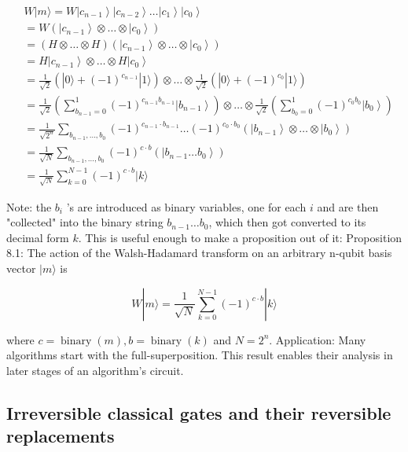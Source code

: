 \documentclass[main.tex]{subfiles}
\begin{document}
    $$
    \begin{aligned}
    &W|m\rangle=W\left|c_{n-1}\right\rangle\left|c_{n-2}\right\rangle \ldots\left|c_{1}\right\rangle\left|c_{0}\right\rangle\\
    &=W\left(\left|c_{n-1}\right\rangle \otimes \ldots \otimes\left|c_{0}\right\rangle\right)\\
    &=(H \otimes \ldots \otimes H)\left(\left|c_{n-1}\right\rangle \otimes \ldots \otimes\left|c_{0}\right\rangle\right)\\
    &=H\left|c_{n-1}\right\rangle \otimes \ldots \otimes H\left|c_{0}\right\rangle\\
    &=\frac{1}{\sqrt{2}}\left(|0\rangle+(-1)^{c_{n-1}}|1\rangle\right) \otimes \ldots \otimes \frac{1}{\sqrt{2}}\left(|0\rangle+(-1)^{c_{0}}|1\rangle\right)\\
    &=\frac{1}{\sqrt{2}}\left(\sum_{b_{n-1}=0}^{1}(-1)^{c_{n-1} b_{n-1}}\left|b_{n-1}\right\rangle\right) \otimes \ldots \otimes \frac{1}{\sqrt{2}}\left(\sum_{b_{0}=0}^{1}(-1)^{c_{0} b_{0}}\left|b_{0}\right\rangle\right)\\
    &=\frac{1}{\sqrt{2^{n}}} \sum_{b_{n-1}, \ldots, b_{0}}(-1)^{c_{n-1} \cdot b_{n-1}} \ldots(-1)^{c_{0} \cdot b_{0}}\left(\left|b_{n-1}\right\rangle \otimes \ldots \otimes\left|b_{0}\right\rangle\right)\\
    &=\frac{1}{\sqrt{N}} \sum_{b_{n-1}, \ldots, b_{0}}(-1)^{c \cdot b}\left(\left|b_{n-1} \ldots b_{0}\right\rangle\right)\\
    &=\frac{1}{\sqrt{N}} \sum_{k=0}^{N-1}(-1)^{c \cdot b}|k\rangle
    \end{aligned}
    $$
    
    Note: the $b_{i}$ 's are introduced as binary variables, one for each $i$ and are then "collected" into the binary string $b_{n-1} \ldots b_{0}$, which then got converted to its decimal form $k$. This is useful enough to make a proposition out of it: Proposition 8.1: The action of the Walsh-Hadamard transform on an arbitrary n-qubit basis vector $|m\rangle$ is
   
    $$
    W|m\rangle=\frac{1}{\sqrt{N}} \sum_{k=0}^{N-1}(-1)^{c \cdot b}|k\rangle
    $$
    
    where $c=\operatorname{binary}(m), b=\operatorname{binary}(k)$ and $N=2^{n}$. Application: Many algorithms start with the full-superposition. This result enables their analysis in later stages of an algorithm's circuit.
    

\subsection{Irreversible classical gates and their reversible replacements}
\end{document}
